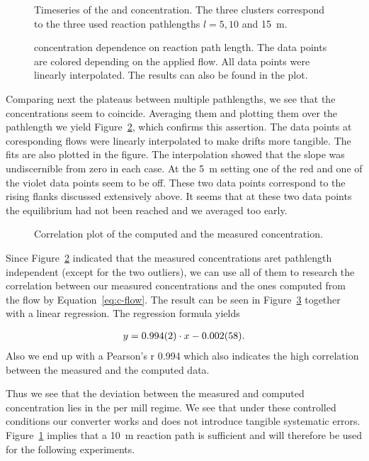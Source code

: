 \begin{figure}[htbp]
  \centering
  
  \hfill
  
  \caption{Timeseries of the  and  concentration. The
    three clusters correspond to the three used reaction pathlengths
    $l = 5, 10$ and \SI{15}{\meter}.}
  \label{fig:ts}
\end{figure}
\begin{figure}[H]
  \centering
  
  \caption{ concentration dependence on reaction path
    length. The data points are colored depending on the applied
     flow. All data points were linearly interpolated. The
    results can also be found in the plot.}
  \label{fig:no-length}
\end{figure}

Comparing next the  plateaus between multiple pathlengths, we
see that the concentrations seem to coincide. Averaging them and
plotting them over the pathlength we yield Figure~\ref{fig:no-length},
which confirms this assertion. The data points at coresponding flows
were linearly interpolated to make drifts more tangible. The fits are
also plotted in the figure. The interpolation showed that the slope
was undiscernible from zero in each case. At the \SI{5}{\meter}
setting one of the red and one of the violet data points seem to be
off. These two data points correspond to the rising flanks discussed
extensively above. It seems that at these two data points the
equilibrium had not been reached and we averaged too early.

\begin{figure}[htbp]
  \centering
  
  \caption{Correlation plot of the computed and the measured 
    concentration.}
  \label{fig:no-calib}
\end{figure}

Since Figure~\ref{fig:no-length} indicated that the measured
concentrations aret pathlength independent (except for the two outliers),
we can use all of them to research the correlation between our
measured concentrations and the ones computed from the flow by
Equation~\eqref{eq:c-flow}. The result can be seen in
Figure~\ref{fig:no-calib} together with a linear regression. The
regression formula yields

\begin{align*}
  y = \num{0.994 \pm 0.002}  \cdot x -\num{0.002 \pm 0.058}.
\end{align*}
Also we end up with a Pearson's r 0.994 which also indicates the high
correlation between the measured and the computed data.

Thus we see that the deviation between the measured and computed
concentration lies in the per mill regime. We see that under these
controlled conditions our converter works and does not introduce
tangible systematic errors. Figure~\ref{fig:ts} implies that a
\SI{10}{\meter} reaction path is sufficient and will therefore be used
for the following experiments.

